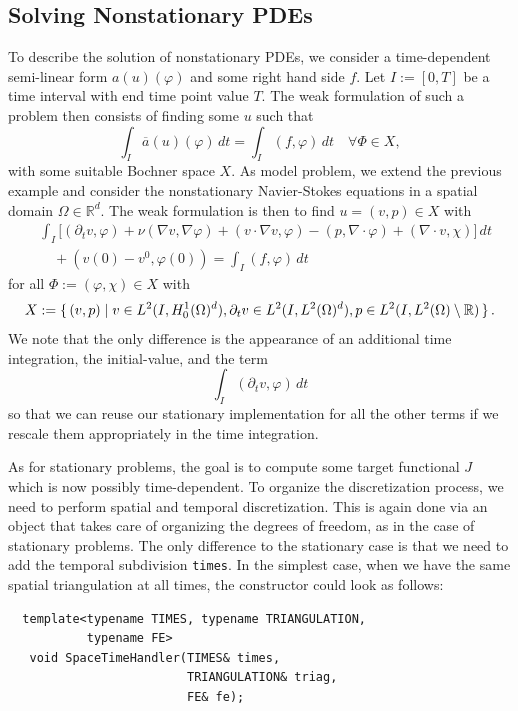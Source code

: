 \documentclass[smallextended]{svjour3}       %
\numberwithin{equation}{section}
\renewcommand{\phi}{\varphi}
\begin{document}
\subsection{Solving Nonstationary PDEs}\label{sec:timedep}
To describe the solution of nonstationary 
PDEs, we consider a time-dependent semi-linear form $a(u)(\phi)$ and some
right hand side $f$. Let $I:=[0,T]$ be a time interval with end time point value $T$.
The weak formulation of such a problem then consists of finding some $u$ such
 that
\[
\int_I \overline{a}(u)(\phi)\, dt = \int_I (f,\phi)\, dt \quad \forall\Phi\in X,
\]
with some suitable Bochner space $X$.  
As model problem,
we extend the previous example and consider the nonstationary Navier-Stokes equations
in a spatial domain $\Omega\in\mathbb{R}^d$. The weak formulation is then to find 
$u = (v,p)\in X$ with
\begin{align*}
&\int_I \bigl[ (\partial_t v, \phi)
+ \nu (\nabla v, \nabla \phi) + (v\cdot\nabla v, \phi)
- (p,\nabla\cdot \phi)
+ (\nabla\cdot v, \chi)\bigr] \, dt\\
&\quad + (v(0) - v^0, \phi(0))
= \int_I (f,\phi) \, dt 
\end{align*}
for all $\Phi:= (\phi, \chi) \in X$ with
\[
X:= \set{ 
(v,p) | v\in L^2(I,H_0^1(\Omega)^d) , 
\partial_t v\in L^2(I, L^2(\Omega)^d), 
p\in L^2(I,L^2(\Omega)\setminus\mathbb{R})}.
\]
We note that the only difference is the appearance of an additional
time integration, the initial-value, and the term 
\[
\int_I (\partial_t v, \phi)\,dt
\]
so that we can reuse our stationary implementation for all the other 
terms if we rescale them appropriately in the time integration.

As for stationary problems, the goal is to compute
some target functional $J$ which is now possibly 
time-dependent. To organize the discretization 
process, we need to perform spatial and temporal 
discretization. This is again done via
an object that takes care of organizing the degrees of 
freedom, as in the case of stationary problems.
The only difference to the stationary case is that we need to 
add the temporal subdivision \texttt{times}. In the simplest 
case, when we have the same spatial triangulation 
at all times, the constructor could look as follows:
\begin{lstlisting}
  template<typename TIMES, typename TRIANGULATION, 
           typename FE>
   void SpaceTimeHandler(TIMES& times,
                         TRIANGULATION& triag,
                         FE& fe);
\end{lstlisting}
\end{document}
